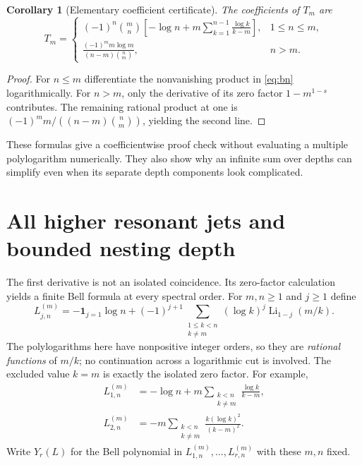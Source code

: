 \documentclass[11pt]{article}
\numberwithin{equation}{section}
\newtheorem{corollary}[theorem]{Corollary}
\theoremstyle{definition}\newtheorem{definition}[theorem]{Definition}
\theoremstyle{remark}\newtheorem{remark}[theorem]{Remark}
\DeclareMathOperator{\Li}{Li}
\begin{document}
\begin{corollary}[Elementary coefficient certificate]
\label{cor:Tcoeff}
The coefficients of $T_m$ are
\begin{equation}
 [w^n]T_m=
 \begin{cases}
 (-1)^n\binom mn\left[-\log n+
       m\displaystyle\sum_{k=1}^{n-1}\frac{\log k}{k-m}\right],&1\le n\le m,\\[5pt]
 \displaystyle\frac{(-1)^m m\log m}{(n-m)\binom nm},&n>m.
 \end{cases}
 \label{eq:Tcoeff}
\end{equation}
\end{corollary}
\begin{proof}
For $n\le m$ differentiate the nonvanishing product in \eqref{eq:bn}
logarithmically. For $n>m$, only the derivative of its zero factor
$1-m^{1-s}$ contributes. The remaining rational product at one is
$(-1)^m m/((n-m)\binom nm)$, yielding the second line.
\end{proof}
These formulas give a coefficientwise proof check without evaluating a
multiple polylogarithm numerically. They also show why an infinite sum over
depths can simplify even when its separate depth components look complicated.

\section{All higher resonant jets and bounded nesting depth}
\label{sec:higher}
The first derivative is not an isolated coincidence. Its zero-factor
calculation yields a finite Bell formula at every spectral order.
For $m,n\ge1$ and $j\ge1$ define
\begin{equation}
 L_{j,n}^{(m)}=-\mathbf1_{j=1}\log n+
 (-1)^{j+1}\sum_{\substack{1\le k<n\\k\ne m}}
        (\log k)^j\Li_{1-j}(m/k).
 \label{eq:Lmn}
\end{equation}
The polylogarithms here have nonpositive integer orders, so they are
\emph{rational functions} of $m/k$; no continuation across a logarithmic cut
is involved. The excluded value $k=m$ is exactly the isolated zero factor.
For example,
\begin{align}
 L_{1,n}^{(m)}&=-\log n+m\sum_{\substack{k<n\\k\ne m}}
                                   \frac{\log k}{k-m},\\
 L_{2,n}^{(m)}&=-m\sum_{\substack{k<n\\k\ne m}}
                                   \frac{k(\log k)^2}{(k-m)^2}.
 \label{eq:Lfirsttwo}
\end{align}
Write $Y_r(L)$ for the Bell polynomial in
$L_{1,n}^{(m)},\ldots,L_{r,n}^{(m)}$ with these $m,n$ fixed.
\end{document}
